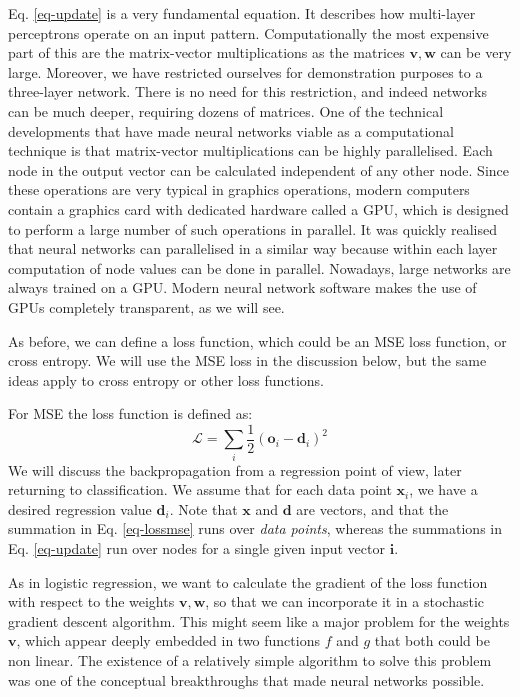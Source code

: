     Eq. \ref{eq-update} is a very fundamental equation. It describes how multi-layer perceptrons operate on an input pattern. Computationally the most expensive
    part of this are the matrix-vector multiplications as the matrices $\boldsymbol{v}, \boldsymbol{w}$ can be very large. Moreover, we have restricted ourselves
    for demonstration purposes to a three-layer network. There is no need for this restriction, and indeed networks can be much deeper, requiring dozens of matrices.
    One of the technical developments that have made neural networks viable as a computational technique is that matrix-vector multiplications can be highly parallelised.
    Each node in the output vector can be calculated independent of any other node. Since these operations are very typical in graphics operations, modern
    computers contain a graphics card with dedicated hardware called a GPU, which is designed to perform a large number of such operations in parallel. It was quickly
    realised that neural networks can parallelised in a similar way because within each layer computation of node values can be done in parallel. Nowadays, large
    networks are always trained on a GPU. Modern neural network software makes the use of GPUs completely transparent, as we will see.
    
    
    As before, we can define a loss function, which could be an MSE loss function, or cross entropy. We will use the MSE loss in the discussion below, but the same ideas
    apply to cross entropy or other loss functions.

    For MSE the loss function is defined as:
    \begin{equation}
      \mathcal{L} = \sum_i \frac{1}{2}(\boldsymbol{o}_i - \boldsymbol{d}_i)^2
      \label{eq-lossmse}
    \end{equation}
    We will discuss the backpropagation from a regression point of view, later returning to classification. We assume that for each data point $\boldsymbol{x}_i$, we have
    a desired regression value $\boldsymbol{d}_i$. Note that $\boldsymbol{x}$ and $\boldsymbol{d}$ are vectors, and that the summation in Eq. \ref{eq-lossmse} runs over
    \emph{data points}, whereas the summations in Eq. \ref{eq-update} run over nodes for a single given input vector $\boldsymbol{i}$.

    As in logistic regression, we want to calculate the gradient of the loss function with respect to the weights $\boldsymbol{v}, \boldsymbol{w}$, so that we can
    incorporate it in a stochastic gradient descent algorithm. This might seem like a major problem for the weights $\boldsymbol{v}$, which appear deeply embedded
    in two functions $f$ and $g$ that both could be non linear. The existence of a relatively simple algorithm to solve this problem was one of the conceptual
    breakthroughs that made neural networks possible.


